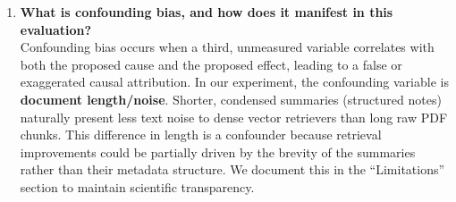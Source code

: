 \begin{enumerate}[label=\textbf{Q\arabic*:}, leftmargin=*]
    \item \textbf{What is confounding bias, and how does it manifest in this evaluation?} \\
    Confounding bias occurs when a third, unmeasured variable correlates with both the proposed cause and the proposed effect, leading to a false or exaggerated causal attribution. 
    In our experiment, the confounding variable is \textbf{document length/noise}. Shorter, condensed summaries (structured notes) naturally present less text noise to dense vector retrievers than long raw PDF chunks. This difference in length is a confounder because retrieval improvements could be partially driven by the brevity of the summaries rather than their metadata structure. We document this in the ``Limitations'' section to maintain scientific transparency.
\end{enumerate}
